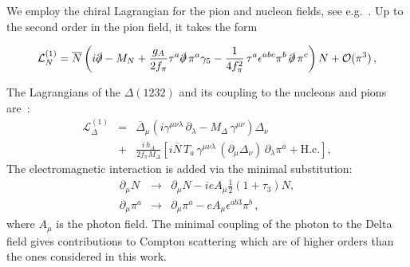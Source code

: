 \documentclass[prc,twocolumn,showpacs,preprintnumbers,amsmath,amssymb
,superscriptaddress,a4paper,nofootinbib
]{revtex4-1}
\begin{document}
We employ the chiral Lagrangian for the pion and nucleon fields, see e.g.~\cite{GSS89}. Up to the second order in the pion field, it takes the form
\begin{widetext}
\begin{align}
\mathcal{L}^{(1)}_{N}  =  \overline{N}\left( i \slashed{\partial} -{M}_{N}
+ \frac{g_A}{2f_\pi} \tau^a \slashed{\partial}\,\pi^a\gamma_5 - \frac{1}{4f_\pi^2} \, \tau^a \epsilon^{abc}  \pi^b\,\slashed{\partial} \,\pi^c
\right) N  + \mathcal{O}(\pi^3) \,,
\label{expNlagran}
\end{align}
\end{widetext}
% 
% 
The Lagrangians of the $\Delta(1232)$ and its coupling to the nucleons and pions are~\cite{Pascalutsa:2002pi,Lensky:2009uv}:
\begin{eqnarray}
\mathcal{L}^{(1)}_{\Delta} &=& \overline\Delta_\mu \left(i\gamma^{\mu\nu\lambda}\,\partial_\lambda - 
M_\Delta\,\gamma^{\mu\nu}\right) \Delta_\nu \nonumber\\
&+&  \frac{i\,h_A}{2f_\pi M_\Delta}
\left[
i \overline N\, T_a%
 \,\gamma^{\mu\nu\lambda}\, (\partial_\mu \Delta_\nu)\, \partial_\lambda\pi^a
+ \mbox{H.c.}\right],
\end{eqnarray}
The electromagnetic interaction is added via the minimal substitution:
\begin{subequations}
\begin{eqnarray}
\partial_\mu N &\to & \partial_\mu N -  i e A_\mu\frac{1}{2}(1+\tau_3) N ,\\
\partial_\mu \pi^a &\to & \partial_\mu \pi^a - eA_\mu\epsilon^{ab3}\pi^b\,,
\end{eqnarray}
\end{subequations}
where $A_\mu$ is the photon field. The minimal coupling of the photon to the Delta field gives contributions to Compton scattering which are of higher orders than the ones considered in this work.
\end{document}
